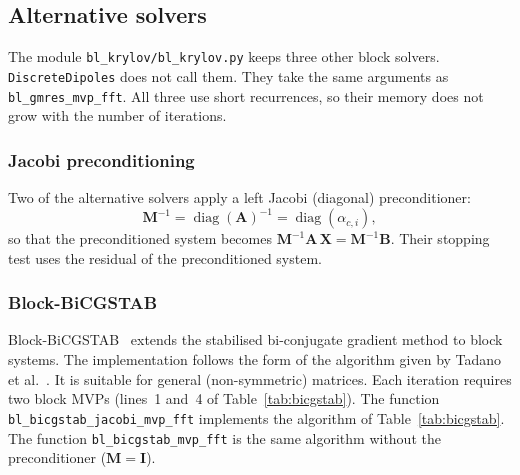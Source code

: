 \documentclass[11pt,a4paper]{article}
\begin{document}
\subsection{Alternative solvers}
\label{sec:alt-solvers}

The module \texttt{bl\_krylov/bl\_krylov.py} keeps three other block
solvers.
\texttt{DiscreteDipoles} does not call them.
They take the same arguments as \texttt{bl\_gmres\_mvp\_fft}.
All three use short recurrences, so their memory does not grow with the
number of iterations.

\subsubsection{Jacobi preconditioning}
\label{sec:jacobi}

Two of the alternative solvers apply a left Jacobi (diagonal)
preconditioner:
\begin{equation}
  \mathbf{M}^{-1} = \operatorname{diag}(\mathbf{A})^{-1}
                   = \operatorname{diag}(\alpha_{c,i}),
  \label{eq:jacobi-precond}
\end{equation}
so that the preconditioned system becomes
$\mathbf{M}^{-1}\mathbf{A}\,\mathbf{X} = \mathbf{M}^{-1}\mathbf{B}$.
Their stopping test uses the residual of the preconditioned system.

\subsubsection{Block-BiCGSTAB}
\label{sec:bicgstab}

Block-BiCGSTAB~\cite{ElGuennouni2003} extends the stabilised
bi-conjugate gradient method to block systems.
The implementation follows the form of the algorithm given by Tadano et
al.~\cite{Tadano2009}.
It is suitable for general (non-symmetric) matrices.
Each iteration requires two block MVPs (lines~1 and~4 of
Table~\ref{tab:bicgstab}).
The function \texttt{bl\_bicgstab\_jacobi\_mvp\_fft} implements the
algorithm of Table~\ref{tab:bicgstab}.
The function \texttt{bl\_bicgstab\_mvp\_fft} is the same algorithm
without the preconditioner ($\mathbf{M} = \mathbf{I}$).
\end{document}
